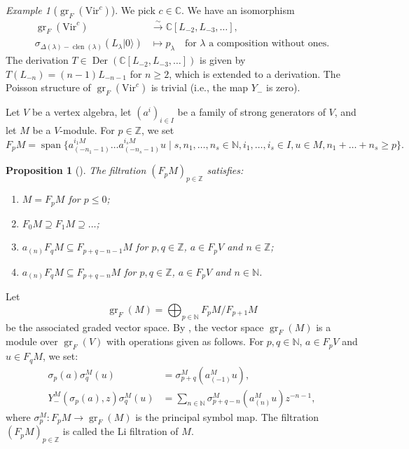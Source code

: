 \documentclass[a4paper, 12pt, reqno]{amsart}
\newtheorem{proposition}[theorem]{Proposition}
\theoremstyle{remark}
\newtheorem{example}[theorem]{Example}
\DeclareMathOperator{\clen}{clen}
\DeclareMathOperator{\gr}{gr}
\DeclareMathOperator{\vspan}{span}
\DeclareMathOperator{\Der}{Der}
\newcommand{\vac}{{|0\rangle}}
\newcommand{\Vir}{{\mathrm{Vir}}}
\begin{document}
\begin{example}[$\gr_F(\Vir^c)$]
  \label{exa:4}
  We pick $c \in \mathbb{C}$.
  We have an isomorphism
  \begin{align*}
    \gr_F(\Vir^c) &\xrightarrow{\sim} \mathbb{C}[L_{-2}, L_{-3}, \dots], \\
    \sigma_{\Delta(\lambda) - \clen(\lambda)}(L_\lambda\vac) &\mapsto p_\lambda \quad \text{for $\lambda$ a composition without ones}.
  \end{align*}
  The derivation $T \in \Der(\mathbb{C}[L_{-2}, L_{-3}, \dots])$ is given by $T(L_{-n}) = (n - 1)L_{-n - 1}$ for $n \ge 2$, which is extended to a derivation.
  The Poisson structure of $\gr_F(\Vir^c)$ is trivial (i.e., the map $Y_-$ is zero).
\end{example}

Let $V$ be a vertex algebra, let $(a^i)_{i \in I}$ be a family of strong generators of $V$, and let $M$ be a $V$-module.
For $p \in \mathbb{Z}$, we set
\begin{equation*}
  F_pM = \vspan\{a^{i_1M}_{(-n_1 - 1)}\dots a^{i_sM}_{(-n_s - 1)}u \mid s, n_1, \dots, n_s \in \mathbb{N}, i_1, \dots, i_s \in I, u \in M, n_1 + \dots + n_s \ge p\}.
\end{equation*}

\begin{proposition}[{\cite{li_abelianizing_2005}}]
  \label{prp:5}
  The filtration $(F_pM)_{p \in \mathbb{Z}}$ satisfies:
  \begin{enumerate}
  \item $M = F_pM$ for $p \le 0$;
  \item $F_0M \supseteq F_1M \supseteq \dots$;
  \item $a_{(n)}F_qM \subseteq F_{p + q - n - 1}M$ for $p, q \in \mathbb{Z}$, $a \in F_pV$ and $n \in \mathbb{Z}$;
  \item $a_{(n)}F_qM \subseteq F_{p + q - n}M$ for $p, q \in \mathbb{Z}$, $a \in F_pV$ and $n \in \mathbb{N}$.
  \end{enumerate}
\end{proposition}

Let
\begin{equation*}
  \gr_F(M) = \bigoplus_{p \in \mathbb{N}}F_pM/F_{p + 1}M
\end{equation*}
be the associated graded vector space.
By \cite{li_abelianizing_2005}, the vector space $\gr_F(M)$ is a module over $\gr_F(V)$ with operations given as follows.
For $p, q \in \mathbb{N}$, $a \in F_pV$ and $u \in F_qM$, we set:
\begin{align*}
  \sigma_p(a)\sigma^M_q(u) &= \sigma^M_{p + q}(a^M_{(-1)}u), \\
  Y^M_-(\sigma_p(a), z)\sigma^M_q(u) &= \sum_{n \in \mathbb{N}}\sigma^M_{p + q - n}(a^M_{(n)}u)z^{-n - 1},
\end{align*}
where $\sigma^M_p: F_pM \to \gr_F(M)$ is the principal symbol map.
The filtration $(F_pM)_{p \in \mathbb{Z}}$ is called the Li filtration of $M$.
\end{document}
